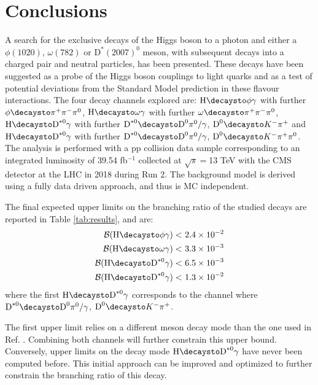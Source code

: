 \chapter*{Conclusions}\label{chap:conclusions}

A search for the exclusive decays of the Higgs boson to a photon and either a $\phi(1020)$, $\omega(782)$ or $\text{D}^{*}(2007)^{0}$ meson, with subsequent decays into a charged pair and neutral particles, has been presented. These decays have been suggested as a probe of the Higgs boson couplings to light quarks and as a test of potential deviations from the Standard Model prediction in these flavour interactions. The four decay channels explored are: $\text{H}\decaysto \phi\gamma$ with further $\phi\decaysto \pi^+\pi^-\pi^0$, $\text{H}\decaysto \omega\gamma$ with further $\omega\decaysto \pi^+\pi^-\pi^0$, $\text{H}\decaysto \text{D}^{*0}\gamma$ with further $\text{D}^{*0}\decaysto \text{D}^{0}\pi^{0}/\gamma$, $\text{D}^{0}\decaysto K^{-}\pi^{+}$ and $\text{H}\decaysto \text{D}^{*0}\gamma$ with further $\text{D}^{*0}\decaysto \text{D}^{0}\pi^{0}/\gamma$, $\text{D}^{0}\decaysto K^{-}\pi^{+}\pi^{0}$. The analysis is performed with a pp collision data sample corresponding to an integrated luminosity of 39.54 fb$^{-1}$ collected at $\sqrt{s}=$13 TeV with the CMS detector at the LHC in 2018 during Run 2. The background model is derived using a fully data driven approach, and thus is MC independent.

The final expected upper limits on the branching ratio of the studied decays are reported in Table \ref{tab:results}, and are:
\begin{equation*}
    \begin{aligned}
        \mathcal{B}(\text{H}\decaysto \phi\gamma) <&\ 2.4 \times 10^{-2}\\
        \mathcal{B}(\text{H}\decaysto \omega\gamma) <&\ 3.3 \times 10^{-3}\\
        \mathcal{B}(\text{H}\decaysto\text{D}^{*0}\gamma) <&\ 6.5 \times 10^{-3}\\
        \mathcal{B}(\text{H}\decaysto\text{D}^{*0}\gamma) <&\ 1.3 \times 10^{-2}\\
\end{aligned}
\end{equation*}
where the first $\text{H}\decaysto\text{D}^{*0}\gamma$ corresponds to the channel where $\text{D}^{*0}\decaysto \text{D}^{0}\pi^{0}/\gamma$, $\text{D}^{0}\decaysto K^{-}\pi^{+}$.

The first upper limit relies on a different meson decay mode than the one used in Ref. \cite{ATLAS:2017gko}. Combining both channels will further constrain this upper bound. Conversely, upper limits on the decay mode $\text{H}\decaysto\text{D}^{*0}\gamma$ have never been computed before. This initial approach can be improved and optimized to further constrain the branching ratio of this decay.

